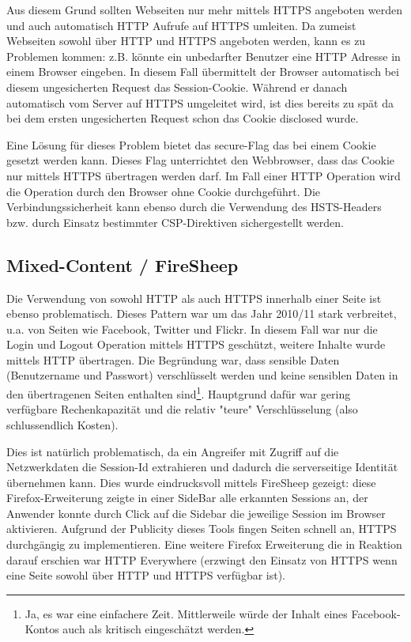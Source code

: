Aus diesem Grund sollten Webseiten nur mehr mittels HTTPS angeboten werden und auch automatisch HTTP Aufrufe auf HTTPS umleiten. Da zumeist Webseiten sowohl über HTTP und HTTPS angeboten werden, kann es zu Problemen kommen: z.B. könnte ein unbedarfter Benutzer eine HTTP Adresse in einem Browser eingeben. In diesem Fall übermittelt der Browser automatisch bei diesem ungesicherten Request das Session-Cookie. Während er danach automatisch vom Server auf HTTPS umgeleitet wird, ist dies bereits zu spät da bei dem ersten ungesicherten Request schon das Cookie disclosed wurde.

Eine Lösung für dieses Problem bietet das secure-Flag das bei einem Cookie gesetzt werden kann. Dieses Flag unterrichtet den Webbrowser, dass das Cookie nur mittels HTTPS übertragen werden darf. Im Fall einer HTTP Operation wird die Operation durch den Browser ohne Cookie durchgeführt.  Die Verbindungssicherheit kann ebenso durch die Verwendung des HSTS-Headers bzw. durch Einsatz bestimmter CSP-Direktiven sichergestellt werden.

\subsection{Mixed-Content / FireSheep}

Die Verwendung von sowohl HTTP als auch HTTPS innerhalb einer Seite ist ebenso problematisch. Dieses Pattern war um das Jahr 2010/11 stark verbreitet, u.a. von Seiten wie Facebook, Twitter und Flickr. In diesem Fall war nur die Login und Logout Operation mittels HTTPS geschützt, weitere Inhalte wurde mittels HTTP übertragen. Die Begründung war, dass sensible Daten (Benutzername und Passwort) verschlüsselt werden und keine sensiblen Daten in den übertragenen Seiten enthalten sind\footnote{Ja, es war eine einfachere Zeit. Mittlerweile würde der Inhalt eines Facebook-Kontos auch als kritisch eingeschätzt werden.}. Hauptgrund dafür war gering verfügbare Rechenkapazität und die relativ "teure" Verschlüsselung (also schlussendlich Kosten).

Dies ist natürlich problematisch, da ein Angreifer mit Zugriff auf die Netzwerkdaten die Session-Id extrahieren und dadurch die serverseitige Identität übernehmen kann. Dies wurde eindrucksvoll mittels FireSheep gezeigt: diese Firefox-Erweiterung zeigte in einer SideBar alle erkannten Sessions an, der Anwender konnte durch Click auf die Sidebar die jeweilige Session im Browser aktivieren. Aufgrund der Publicity dieses Tools fingen Seiten schnell an, HTTPS durchgängig zu implementieren. Eine weitere Firefox Erweiterung die in Reaktion darauf erschien war HTTP Everywhere (erzwingt den Einsatz von HTTPS wenn eine Seite sowohl über HTTP und HTTPS verfügbar ist).



